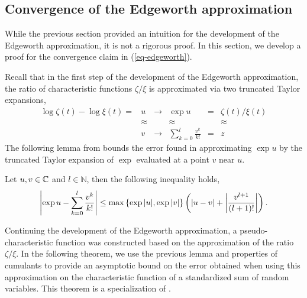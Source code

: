 \subsection{Convergence of the Edgeworth approximation}

While the previous section provided an intuition for the development of the Edgeworth approximation, it is not a rigorous proof. In this section, we develop a proof for the convergence claim in (\ref{eq-edgeworth}).

Recall that in the first step of the development of the Edgeworth approximation, the ratio of characteristic functions $\zeta / \xi$ is approximated via two truncated Taylor expansions,
\begin{equation*}
    \begin{matrix}
        \log \zeta(t) - \log \xi(t) = & u & \longrightarrow & \exp u & = & \zeta(t) / \xi(t)\\
        &\approx & & \approx & & \approx \\
        &v  & \longrightarrow & \sum_{k=0}^l \frac{v^k}{k!} & = & z
    \end{matrix}
\end{equation*}
The following lemma from \cite[Theorem 2.5.3]{kolassa2006series} bounds the error found in approximating $\exp u$ by the truncated Taylor expansion of $\exp$ evaluated at a point $v$ near $u$.
\begin{lemma} \label{lemma-series}
    Let $u, v \in \mathbb{C}$ and $l \in \mathbb{N}$, then the following inequality holds,
    \begin{equation}
        \left|\exp{u} - \sum_{k=0}^l \frac{v^k}{k!}\right| \leq \max \left\{ \exp{|u|}, \exp{|v|} \right\}\left(\left|u - v\right| + \left|\frac{v^{l+1}}{(l+1)!}\right|\right).
    \end{equation}
\end{lemma}


Continuing the development of the Edgeworth approximation, a pseudo-characteristic function was constructed based on the approximation of the ratio $\zeta / \xi$. In the following theorem, we use the previous lemma and properties of cumulants to provide an asymptotic bound on the error obtained when using this approximation on the characteristic function of a standardized sum of random variables. This theorem is a specialization of \cite[Corollary 2.5.4]{kolassa2006series}.

